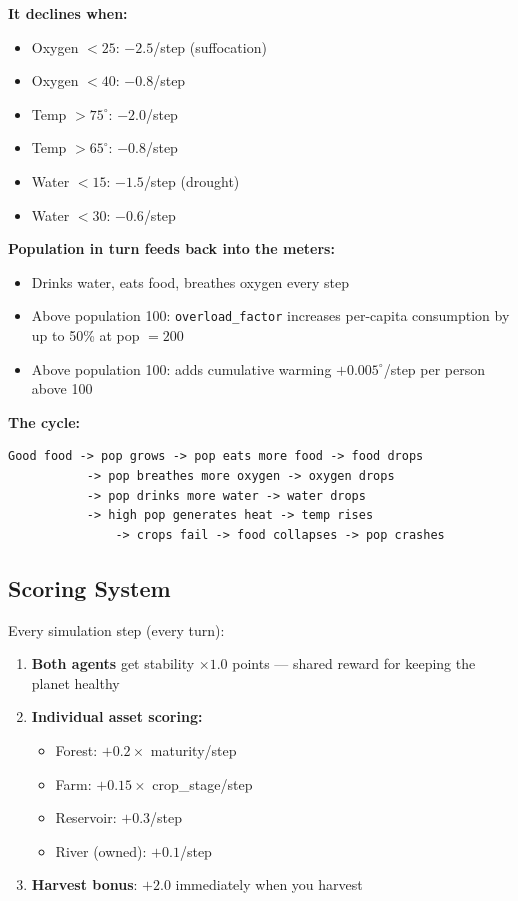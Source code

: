 \documentclass[12pt,a4paper]{article}
\begin{document}
\textbf{It declines when:}
\begin{itemize}[leftmargin=1.5cm]
    \item Oxygen $< 25$: $-2.5$/step (suffocation)
    \item Oxygen $< 40$: $-0.8$/step
    \item Temp $> 75^\circ$: $-2.0$/step
    \item Temp $> 65^\circ$: $-0.8$/step
    \item Water $< 15$: $-1.5$/step (drought)
    \item Water $< 30$: $-0.6$/step
\end{itemize}

\textbf{Population in turn feeds back into the meters:}
\begin{itemize}[leftmargin=1.5cm]
    \item Drinks water, eats food, breathes oxygen every step
    \item Above population 100: \texttt{overload\_factor} increases per-capita consumption by up to 50\% at pop $= 200$
    \item Above population 100: adds cumulative warming $+0.005^\circ$/step per person above 100
\end{itemize}

\textbf{The cycle:}

\begin{lstlisting}
Good food -> pop grows -> pop eats more food -> food drops
           -> pop breathes more oxygen -> oxygen drops
           -> pop drinks more water -> water drops
           -> high pop generates heat -> temp rises
               -> crops fail -> food collapses -> pop crashes
\end{lstlisting}

\subsection{Scoring System}

Every simulation step (every turn):
\begin{enumerate}[leftmargin=1.5cm]
    \item \textbf{Both agents} get stability $\times 1.0$ points --- shared reward for keeping the planet healthy
    \item \textbf{Individual asset scoring:}
    \begin{itemize}[leftmargin=1.5cm]
        \item Forest: $+0.2 \times$ maturity/step
        \item Farm: $+0.15 \times$ crop\_stage/step
        \item Reservoir: $+0.3$/step
        \item River (owned): $+0.1$/step
    \end{itemize}
    \item \textbf{Harvest bonus}: $+2.0$ immediately when you harvest
\end{enumerate}
\end{document}
